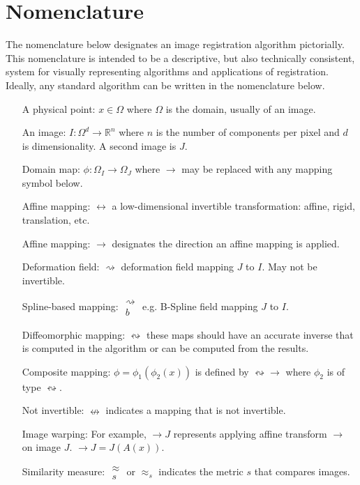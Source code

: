\documentclass{frontiersSCNS}
\begin{document}
\section{Nomenclature}
The nomenclature below designates an image registration
algorithm pictorially.  This nomenclature is intended to be a
descriptive, but also technically consistent, system for visually
representing algorithms and applications of registration.  Ideally,
any standard algorithm can be written in the nomenclature below.
\begin{enumerate}
\item [A physical point:] $x \in \Omega$ where $\Omega$ is the domain,
  usually of an image.
\item [An image:]  $ I \colon \Omega^d \to \mathbb{R}^n$ where $n$ is the
  number of components per pixel and $d$ is dimensionality.  A second
  image is $J$. 
\item [Domain map:] $ \phi \colon \Omega_I \to \Omega_J $ where $\to$ may be
  replaced with any mapping symbol below. 
\item [Affine mapping:] $\leftrightarrow$ a low-dimensional invertible 
  transformation: affine, rigid, translation, etc. 
\item [Affine mapping:] $\rightarrow$ designates the direction an
  affine mapping is applied.  
\item [Deformation field:] $ \rightsquigarrow$ deformation field mapping $J$
  to $I$.  May not be invertible.
\item [Spline-based mapping:] $\substack{
   \rightsquigarrow \\
   b
  }$ e.g. B-Spline field mapping $J$
  to $I$.
\item [Diffeomorphic mapping:] $ \leftrightsquigarrow$ these maps
  should have an accurate inverse that is computed in the algorithm or can be computed from the results.
\item [Composite mapping:] $\phi=\phi_1(\phi_2(x))$ is defined by
  $ \leftrightsquigarrow \rightarrow $ where $\phi_2$ is of type
  $\leftrightsquigarrow$. 
\item[Not invertible:]  $\nleftrightarrow$ indicates a mapping that is
  not invertible.
\item [Image warping:] For example, $ \rightarrow J$ represents
applying affine transform $\rightarrow$ on image $J$.
$\rightarrow J = J( A( x ) ) $.
\item [Similarity measure:] $\substack{
   \approx \\
   s
  }$ or $\approx_s$ indicates the metric $s$ that compares images.

\end{enumerate}
\end{document}
